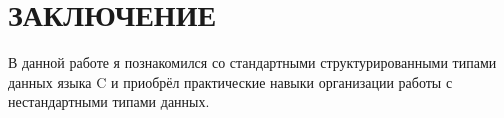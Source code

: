 \section*{ЗАКЛЮЧЕНИЕ}

В данной работе я познакомился со стандартными структурированными типами данных языка C и приобрёл практические навыки организации работы с нестандартными типами данных.

\newpage